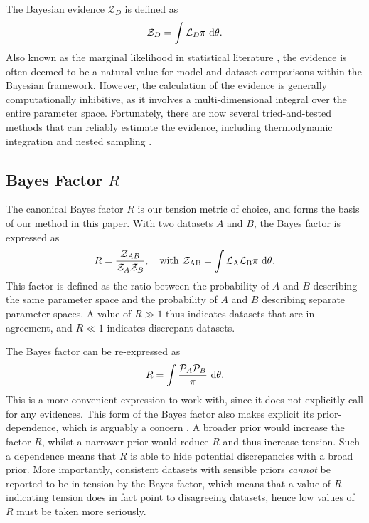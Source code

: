 \documentclass[%
 reprint,
 amsmath,amssymb,
 aps,
]{revtex4-2}
\begin{document}
The Bayesian evidence $\mathcal{Z}_D$ is defined as 
\begin{equation}
    \mathcal{Z}_D = \int \mathcal{L}_D \pi \ \rm{d} \theta.
\end{equation}
Also known as the marginal likelihood in statistical literature \cite{Trotta2008}, the evidence is often deemed to be a natural value for model and dataset comparisons within the Bayesian framework. However, the calculation of the evidence is generally computationally inhibitive, as it involves a multi-dimensional integral over the entire parameter space. Fortunately, there are now several tried-and-tested methods that can reliably estimate the evidence, including thermodynamic integration \cite{Lartillot2006} and nested sampling \cite{Skilling2006, Handley2015}.


\subsection{Bayes Factor $R$}

The canonical Bayes factor $R$ \cite{Marshall2006} is our tension metric of choice, and forms the basis of our method in this paper. With two datasets $A$ and $B$, the Bayes factor is expressed as
\begin{equation}
    R = \frac{\mathcal{Z}_{AB}}{\mathcal{Z}_A \mathcal{Z}_B}, \quad \rm{with} \ \mathcal{Z}_{AB} = \int \mathcal{L}_A \mathcal{L}_B \pi \ \rm{d}\theta.
\end{equation}
This factor is defined as the ratio between the probability of $A$ and $B$ describing the same parameter space and the probability of $A$ and $B$ describing separate parameter spaces. A value of $R \gg 1$ thus indicates datasets that are in agreement, and $R \ll 1$ indicates discrepant datasets.

The Bayes factor can be re-expressed as 
\begin{equation}
    R = \int \frac{\mathcal{P}_A \mathcal{P}_B}{\pi} \ \rm{d}\theta.
\end{equation}
This is a more convenient expression to work with, since it does not explicitly call for any evidences. This form of the Bayes factor also makes explicit its prior-dependence, which is arguably a concern \cite{Handley2019}. A broader prior would increase the factor $R$, whilst a narrower prior would reduce $R$ and thus increase tension. Such a dependence means that $R$ is able to hide potential discrepancies with a broad prior. More importantly, consistent datasets with sensible priors \textit{cannot} be reported to be in tension by the Bayes factor, which means that a value of $R$ indicating tension does in fact point to disagreeing datasets, hence low values of $R$ must be taken more seriously. 
\end{document}
